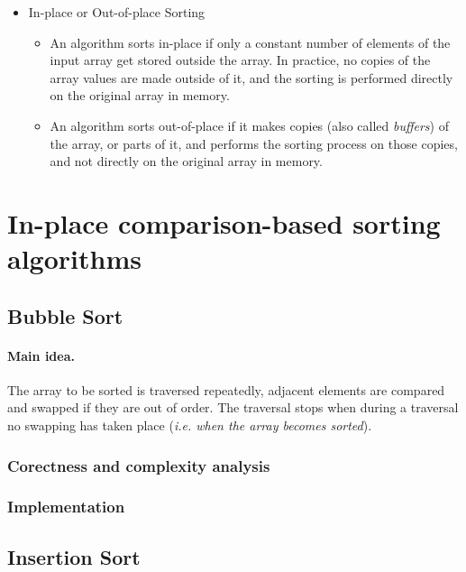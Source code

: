 \documentclass[a4paper]{article}
\begin{document}
\begin{itemize}
                \item In-place or Out-of-place Sorting
                    \begin{itemize}
                        \item An algorithm sorts in-place if only a constant number of elements of the input array get stored outside the array\supercite{clrs_algorithms}. In practice, no copies of the array values are made outside of it, and the sorting is performed directly on the original array in memory.
                        \item An algorithm sorts out-of-place if it makes copies (also called \emph{buffers}) of the array, or parts of it, and performs the sorting process on those copies, and not directly on the original array in memory.
                    \end{itemize}
            \end{itemize}
        
        \newpage
        \section{In-place comparison-based sorting algorithms}

            \subsection{Bubble Sort}
                \paragraph{Main idea.}
                The array to be sorted is traversed repeatedly, 
                adjacent elements are compared and swapped if they are out of order. The traversal stops when during a 
                traversal no swapping has taken place (\textit{i.e. when the array becomes sorted}).
                \subsubsection*{Corectness and complexity analysis}
                \subsubsection*{Implementation}

            \subsection{Insertion Sort}
\end{document}
